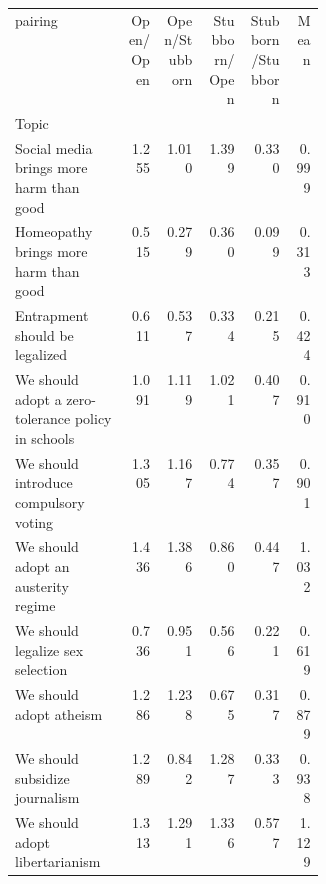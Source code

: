 \begin{tabular}{p{0.36\linewidth}rrrrr}
\toprule
pairing &  Open/Open &  Open/Stubborn &  Stubborn/Open &  Stubborn/Stubborn &  Mean \\
Topic                                              &            &                &                &                    &       \\
\midrule
Social media brings more harm than good            &      1.255 &          1.010 &          1.399 &              0.330 & 0.999 \\
Homeopathy brings more harm than good              &      0.515 &          0.279 &          0.360 &              0.099 & 0.313 \\
Entrapment should be legalized                     &      0.611 &          0.537 &          0.334 &              0.215 & 0.424 \\
We should adopt a zero-tolerance policy in schools &      1.091 &          1.119 &          1.021 &              0.407 & 0.910 \\
We should introduce compulsory voting              &      1.305 &          1.167 &          0.774 &              0.357 & 0.901 \\
We should adopt an austerity regime                &      1.436 &          1.386 &          0.860 &              0.447 & 1.032 \\
We should legalize sex selection                   &      0.736 &          0.951 &          0.566 &              0.221 & 0.619 \\
We should adopt atheism                            &      1.286 &          1.238 &          0.675 &              0.317 & 0.879 \\
We should subsidize journalism                     &      1.289 &          0.842 &          1.287 &              0.333 & 0.938 \\
We should adopt libertarianism                     &      1.313 &          1.291 &          1.336 &              0.577 & 1.129 \\
\bottomrule
\end{tabular}

